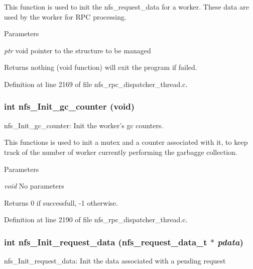 This function is used to init the nfs\_\-request\_\-data for a worker. These data are used by the worker for RPC processing.


\begin{DoxyParams}{Parameters}
\item[{\em ptr}]void pointer to the structure to be managed\end{DoxyParams}
\begin{DoxyReturn}{Returns}
nothing (void function) will exit the program if failed. 
\end{DoxyReturn}


Definition at line 2169 of file nfs\_\-rpc\_\-dispatcher\_\-thread.c.
\subsubsection[{nfs\_\-Init\_\-gc\_\-counter}]{\setlength{\rightskip}{0pt plus 5cm}int nfs\_\-Init\_\-gc\_\-counter (void)}\label{nfs__rpc__dispatcher__thread_8c_a47e8bde054e96db98693ae1d2d74cd43}
nfs\_\-Init\_\-gc\_\-counter: Init the worker's gc counters.

This functions is used to init a mutex and a counter associated with it, to keep track of the number of worker currently performing the garbagge collection.


\begin{DoxyParams}{Parameters}
\item[{\em void}]No parameters\end{DoxyParams}
\begin{DoxyReturn}{Returns}
0 if successfull, -\/1 otherwise. 
\end{DoxyReturn}


Definition at line 2190 of file nfs\_\-rpc\_\-dispatcher\_\-thread.c.
\subsubsection[{nfs\_\-Init\_\-request\_\-data}]{\setlength{\rightskip}{0pt plus 5cm}int nfs\_\-Init\_\-request\_\-data (nfs\_\-request\_\-data\_\-t $\ast$ {\em pdata})}\label{nfs__rpc__dispatcher__thread_8c_afb82d52b463ced09d03ad467d1c05dd4}
nfs\_\-Init\_\-request\_\-data: Init the data associated with a pending request

